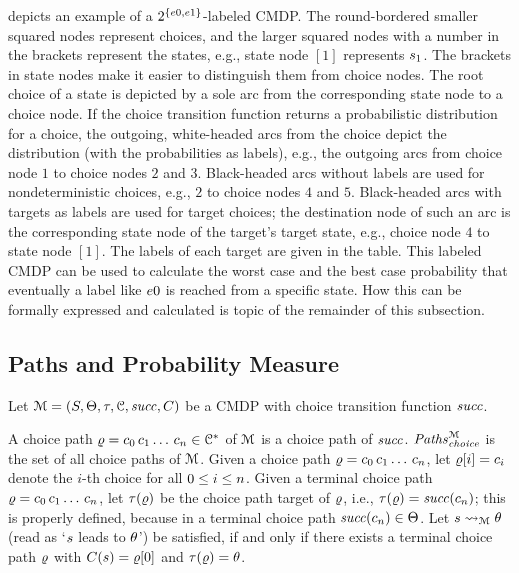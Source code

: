  depicts an example of a $2^{\{\dsformula{0},\dsformula{1}\}}$-labeled CMDP.
The round-bordered smaller squared nodes represent choices,
and the larger squared nodes with a number in the brackets represent the states, e.g., state node $[1]$ represents $\state_1$.
The brackets in state nodes make it easier to distinguish them from choice nodes.
The root choice of a state is depicted by a sole arc from the corresponding state node to a choice node.
If the choice transition function returns a probabilistic distribution for a choice, the outgoing, white-headed arcs from the choice depict the distribution (with the probabilities as labels),
e.g., the outgoing arcs from choice node $1$ to choice nodes $2$ and $3$.
Black-headed arcs without labels are used for nondeterministic choices, e.g., $2$ to choice nodes $4$ and $5$.
Black-headed arcs with targets as labels are used for target choices; the destination node of such an arc is the corresponding state node of the target's target state, e.g., choice node $4$ to state node $[1]$.
The labels of each target are given in the table.
This labeled CMDP can be used to calculate the worst case and the best case probability that eventually a label like $\dsformula{0}$ is reached from a specific state.
How this can be formally expressed and calculated is topic of the remainder of this subsection.


\subsection{Paths and Probability Measure}

Let $\Cmdp=(\States, \Targets, \targetstate, \Choices, \choiceTrans, \StateRootChoice)$ be a CMDP with choice transition function $\choiceTrans$.

A choice path $\cpath = \cmdpChoice_0\,\cmdpChoice_1\dotspath\,\cmdpChoice_n \in \Choices^*$ of $\Cmdp$ is a choice path of $\choiceTrans$.
$\CmdpChoicePaths$ is the set of all choice paths of $\Cmdp$. 
Given a choice path $\cpath = \cmdpChoice_0\,\cmdpChoice_1\dotspath\,\cmdpChoice_n$,
let $\cpath[i]=\cmdpChoice_i$ denote the $i$-th choice for all $\natrange{i}{0}{n}$.
Given a terminal choice path $\cpath = \cmdpChoice_0\,\cmdpChoice_1\dotspath\,\cmdpChoice_n$, let  $\choicepathtarget(\cpath)$ be the choice path target of $\cpath$, i.e.,  $\choicepathtarget(\cpath)=\choiceTrans(\cmdpChoice_n)$; this is properly defined, because in a terminal choice path $\choiceTrans(\cmdpChoice_n)\in\Targets$.
%
Let $\state \cmdpLeadsto \target$ (read as `$\state$ leads to $\target$') be satisfied, if and only if there exists a terminal choice path $\cpath$ with $\StateRootChoice(\state)=\cpath[0]$ and $\choicepathtarget(\cpath)=\target$.


